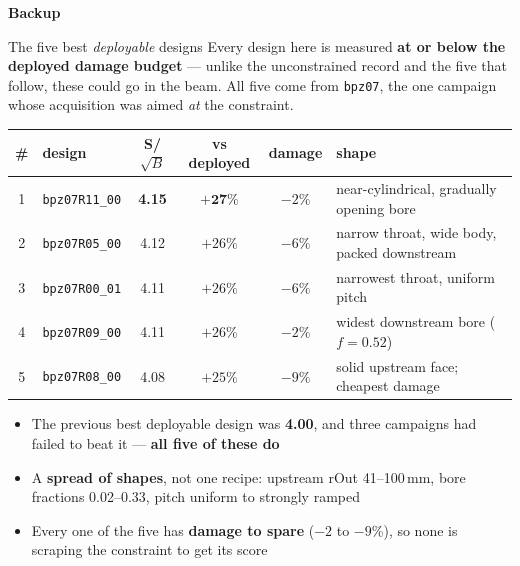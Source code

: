 \documentclass[aspectratio=169,10pt]{beamer}
\begin{document}
\begin{frame}[plain]
\vspace{2.5em}
\begin{center}
{\Large\bfseries\color{fnalblue} Backup}
\end{center}
\end{frame}

\begin{frame}{The five best \emph{deployable} designs}
\footnotesize
Every design here is measured \textbf{at or below the deployed damage budget} ---
unlike the unconstrained record and the five that follow, these could go in the
beam. All five come from \texttt{bpz07}, the one campaign whose acquisition was
aimed \emph{at} the constraint.
\vspace{0.5em}
\begin{center}
\scriptsize
\begin{tabular}{@{}clcccl@{}}
\hline
\# & design & S/$\sqrt{B}$ & vs deployed & damage & shape \\
\hline
1 & \texttt{bpz07R11\_00} & \textbf{4.15} & $\mathbf{+27\%}$ & $-2\%$ & near-cylindrical, gradually opening bore \\
2 & \texttt{bpz07R05\_00} & 4.12 & $+26\%$ & $-6\%$ & narrow throat, wide body, packed downstream \\
3 & \texttt{bpz07R00\_01} & 4.11 & $+26\%$ & $-6\%$ & narrowest throat, uniform pitch \\
4 & \texttt{bpz07R09\_00} & 4.11 & $+26\%$ & $-2\%$ & widest downstream bore ($f=0.52$) \\
5 & \texttt{bpz07R08\_00} & 4.08 & $+25\%$ & $-9\%$ & solid upstream face; cheapest damage \\
\hline
\end{tabular}
\end{center}
\vspace{0.5em}
\begin{itemize}\footnotesize
  \item The previous best deployable design was \textbf{4.00}, and three campaigns
        had failed to beat it --- \textbf{all five of these do}
  \item A \textbf{spread of shapes}, not one recipe: upstream rOut 41--100\,mm,
        bore fractions 0.02--0.33, pitch uniform to strongly ramped
  \item Every one of the five has \textbf{damage to spare} ($-2$ to $-9\%$), so
        none is scraping the constraint to get its score
\end{itemize}
\end{frame}
\end{document}
